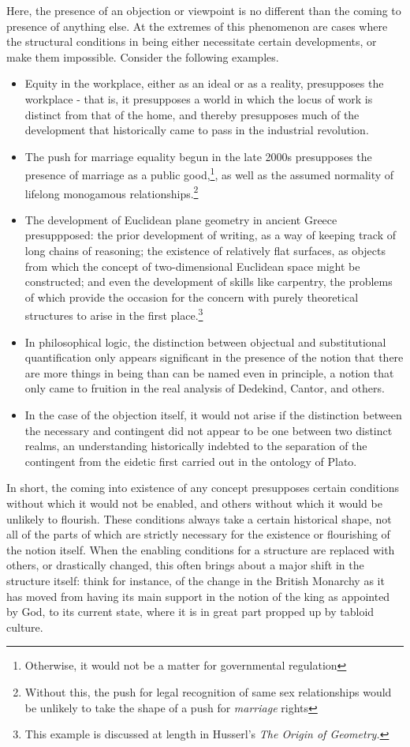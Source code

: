 \documentclass[]{article}
\begin{document}
Here, the presence of an objection or viewpoint is no different than the coming to presence of anything else. At the extremes of this phenomenon are cases where the structural conditions in being either necessitate certain developments, or make them impossible. Consider the following examples. 
\begin{itemize}
	\item Equity in the workplace, either as an ideal or as a reality, presupposes the workplace - that is, it presupposes a world in which the locus of work is distinct from that of the home, and thereby presupposes much of the development that historically came to pass in the industrial revolution. 
	\item The push for marriage equality begun in the late 2000s presupposes the presence of marriage as a public good,\footnote{Otherwise, it would not be a matter for governmental regulation}, as well as the assumed normality of lifelong monogamous relationships.\footnote{Without this, the push for legal recognition of same sex relationships would be unlikely to take the shape of a push for \textit{marriage} rights} 
	\item The development of Euclidean plane geometry in ancient Greece presuppposed: the prior development of writing, as a way of keeping track of long chains of reasoning; the existence of relatively flat surfaces, as objects from which the concept of two-dimensional Euclidean space might be constructed; and even the development of skills like carpentry, the problems of which provide the occasion for the concern with purely theoretical structures to arise in the first place.\footnote{This example is discussed at length in Husserl's \textit{The Origin of Geometry.}}
	\item In philosophical logic, the distinction between objectual and substitutional quantification only appears significant in the presence of the notion that there are more things in being than can be named even in principle, a notion that only came to fruition in the real analysis of Dedekind, Cantor, and others.  
	\item In the case of the objection itself, it would not arise if the distinction between the necessary and contingent did not appear to be one between two distinct realms, an understanding historically indebted to the separation of the contingent from the eidetic first carried out in the ontology of Plato. 
\end{itemize}

In short, the coming into existence of any concept presupposes certain conditions without which it would not be enabled, and others without which it would be unlikely to flourish. These conditions always take a certain historical shape, not all of the parts of which are strictly necessary for the existence or flourishing of the notion itself. When the enabling conditions for a structure are replaced with others, or drastically changed, this often brings about a major shift in the structure itself: think for instance, of the change in the British Monarchy as it has moved from having its main support in the notion of the king as appointed by God, to its current state, where it is in great part propped up by tabloid culture.
\end{document}
